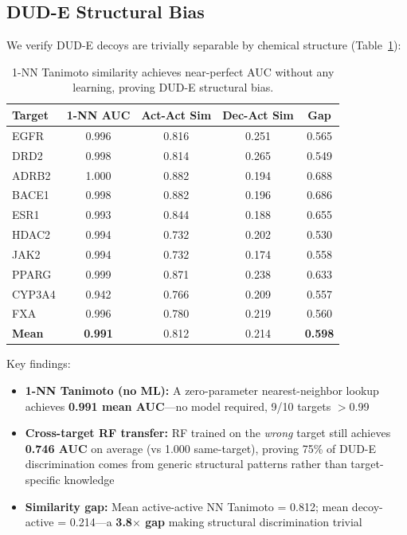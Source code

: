 \documentclass[sigconf,anonymous]{acmart}
\begin{document}
\subsection{DUD-E Structural Bias}

We verify DUD-E decoys are trivially separable by chemical structure (Table~\ref{tab:dude_bias}):

\begin{table}[t]
\caption{1-NN Tanimoto similarity achieves near-perfect AUC without any learning, proving DUD-E structural bias.}
\label{tab:dude_bias}
\centering
\small
\begin{tabular}{@{}lcccc@{}}
\toprule
Target & 1-NN AUC & Act-Act Sim & Dec-Act Sim & Gap \\
\midrule
EGFR & 0.996 & 0.816 & 0.251 & 0.565 \\
DRD2 & 0.998 & 0.814 & 0.265 & 0.549 \\
ADRB2 & 1.000 & 0.882 & 0.194 & 0.688 \\
BACE1 & 0.998 & 0.882 & 0.196 & 0.686 \\
ESR1 & 0.993 & 0.844 & 0.188 & 0.655 \\
HDAC2 & 0.994 & 0.732 & 0.202 & 0.530 \\
JAK2 & 0.994 & 0.732 & 0.174 & 0.558 \\
PPARG & 0.999 & 0.871 & 0.238 & 0.633 \\
CYP3A4 & 0.942 & 0.766 & 0.209 & 0.557 \\
FXA & 0.996 & 0.780 & 0.219 & 0.560 \\
\midrule
\textbf{Mean} & \textbf{0.991} & 0.812 & 0.214 & \textbf{0.598} \\
\bottomrule
\end{tabular}
\end{table}

Key findings:
\begin{itemize}[noitemsep,topsep=0pt]
\item \textbf{1-NN Tanimoto (no ML):} A zero-parameter nearest-neighbor lookup achieves \textbf{0.991 mean AUC}---no model required, 9/10 targets $>$0.99
\item \textbf{Cross-target RF transfer:} RF trained on the \textit{wrong} target still achieves \textbf{0.746 AUC} on average (vs 1.000 same-target), proving 75\% of DUD-E discrimination comes from generic structural patterns rather than target-specific knowledge
\item \textbf{Similarity gap:} Mean active-active NN Tanimoto = 0.812; mean decoy-active = 0.214---a \textbf{3.8$\times$ gap} making structural discrimination trivial
\end{itemize}
\end{document}
